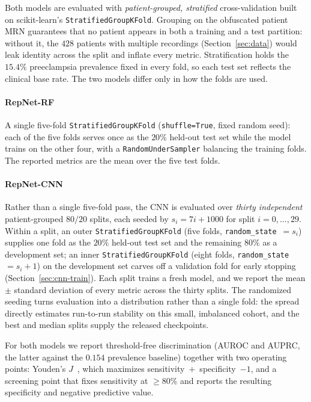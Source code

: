 \documentclass[sigconf,nonacm]{acmart}
\begin{document}
Both models are evaluated with \emph{patient-grouped, stratified}
cross-validation built on scikit-learn's \texttt{StratifiedGroupKFold}.
Grouping on the obfuscated patient MRN guarantees that no patient appears in
both a training and a test partition: without it, the $428$ patients with
multiple recordings (Section~\ref{sec:data}) would leak identity across the
split and inflate every metric. Stratification holds the $15.4\%$
preeclampsia prevalence fixed in every fold, so each test set reflects the
clinical base rate. The two models differ only in how the folds are used.

\paragraph{RepNet-RF} A single five-fold \texttt{StratifiedGroupKFold}
(\texttt{shuffle=True}, fixed random seed): each of the five folds serves
once as the $20\%$ held-out test set while the model trains on the other
four, with a \texttt{RandomUnderSampler} balancing the training folds. The
reported metrics are the mean over the five test folds.

\paragraph{RepNet-CNN} Rather than a single five-fold pass, the CNN is
evaluated over \emph{thirty independent} patient-grouped $80/20$ splits, each
seeded by $s_i = 7i + 1000$ for split $i = 0,\dots,29$. Within a split, an
outer \texttt{StratifiedGroupKFold} (five folds, \texttt{random\_state}~$=s_i$)
supplies one fold as the $20\%$ held-out test set and the remaining $80\%$ as
a development set; an inner \texttt{StratifiedGroupKFold} (eight folds,
\texttt{random\_state}~$=s_i+1$) on the development set carves off a
validation fold for early stopping (Section~\ref{sec:cnn-train}). Each split
trains a fresh model, and we report the mean $\pm$ standard deviation of every
metric across the thirty splits. The randomized seeding turns evaluation into
a distribution rather than a single fold: the spread directly estimates
run-to-run stability on this small, imbalanced cohort, and the best and
median splits supply the released checkpoints.

For both models we report threshold-free discrimination (AUROC and AUPRC,
the latter against the $0.154$ prevalence baseline) together with two
operating points: Youden's $J$~\cite{youden_index_1950}, which maximizes
sensitivity~$+$~specificity~$-1$, and a screening point that fixes
sensitivity at $\geq 80\%$ and reports the resulting specificity and negative
predictive value.
\end{document}
